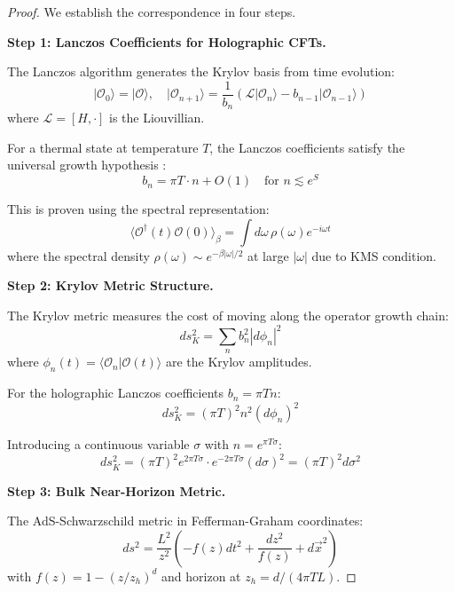 \documentclass[12pt,a4paper]{article}
\begin{document}
\begin{proof}
We establish the correspondence in four steps.

\textbf{Step 1: Lanczos Coefficients for Holographic CFTs.}

The Lanczos algorithm generates the Krylov basis from time evolution:
\begin{equation}
|\mathcal{O}_0\rangle = |\mathcal{O}\rangle, \quad |\mathcal{O}_{n+1}\rangle = \frac{1}{b_n}\left( \mathcal{L}|\mathcal{O}_n\rangle - b_{n-1}|\mathcal{O}_{n-1}\rangle \right)
\end{equation}
where $\mathcal{L} = [H, \cdot]$ is the Liouvillian.

For a thermal state at temperature $T$, the Lanczos coefficients satisfy the universal growth hypothesis \cite{parker2019}:
\begin{equation}
b_n = \pi T \cdot n + O(1) \quad \text{for } n \lesssim e^{S}
\end{equation}

This is proven using the spectral representation:
\begin{equation}
\langle \mathcal{O}^\dagger(t) \mathcal{O}(0) \rangle_\beta = \int d\omega \, \rho(\omega) e^{-i\omega t}
\end{equation}
where the spectral density $\rho(\omega) \sim e^{-\beta|\omega|/2}$ at large $|\omega|$ due to KMS condition.

\textbf{Step 2: Krylov Metric Structure.}

The Krylov metric measures the cost of moving along the operator growth chain:
\begin{equation}
ds^2_K = \sum_n b_n^2 |d\phi_n|^2
\end{equation}
where $\phi_n(t) = \langle \mathcal{O}_n | \mathcal{O}(t) \rangle$ are the Krylov amplitudes.

For the holographic Lanczos coefficients $b_n = \pi T n$:
\begin{equation}
ds^2_K = (\pi T)^2 n^2 (d\phi_n)^2
\end{equation}

Introducing a continuous variable $\sigma$ with $n = e^{\pi T \sigma}$:
\begin{equation}
ds^2_K = (\pi T)^2 e^{2\pi T \sigma} \cdot e^{-2\pi T \sigma} (d\sigma)^2 = (\pi T)^2 d\sigma^2
\end{equation}

\textbf{Step 3: Bulk Near-Horizon Metric.}

The AdS-Schwarzschild metric in Fefferman-Graham coordinates:
\begin{equation}
ds^2 = \frac{L^2}{z^2}\left( -f(z) dt^2 + \frac{dz^2}{f(z)} + d\vec{x}^2 \right)
\end{equation}
with $f(z) = 1 - (z/z_h)^d$ and horizon at $z_h = d/(4\pi T L)$.


\end{proof}
\end{document}
